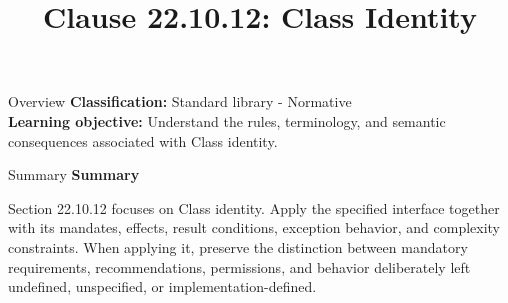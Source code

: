 \documentclass[10pt,letterpaper]{article}
\title{Clause 22.10.12: Class Identity}
\author{}
\date{}
\begin{document}
\maketitle
\begin{CornellOverviewBox}{Overview}
\textbf{Classification:} Standard library - Normative\\[2pt]
\textbf{Learning objective:} Understand the rules, terminology, and semantic consequences associated with Class identity.
\end{CornellOverviewBox}\begin{CornellSummaryBox}{Summary}
{\sffamily\bfseries\color{Accent} Summary}\par\vspace{3pt}Section 22.10.12 focuses on Class identity. Apply the specified interface together with its mandates, effects, result conditions, exception behavior, and complexity constraints. When applying it, preserve the distinction between mandatory requirements, recommendations, permissions, and behavior deliberately left undefined, unspecified, or implementation-defined.
\end{CornellSummaryBox}
\end{document}

